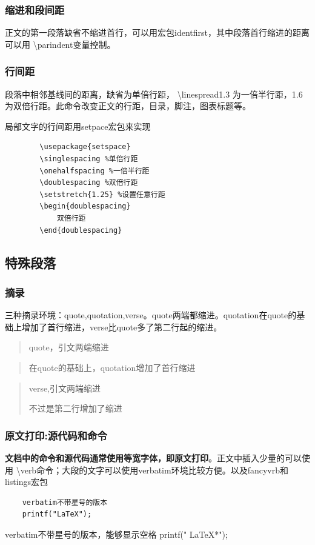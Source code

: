\documentclass[16pt]{article}
\begin{document}
\subsubsection{缩进和段间距}
正文的第一段落缺省不缩进首行，可以用宏包identfirst，其中段落首行缩进的距离可以用 \textbackslash parindent变量控制。

\subsubsection{行间距}
段落中相邻基线间的距离，缺省为单倍行距， \textbackslash linespread{1.3} 为一倍半行距，{1.6}为双倍行距。此命令改变正文的行距，目录，脚注，图表标题等。\par
局部文字的行间距用setpace宏包来实现
\begin{lstlisting}
        \usepackage{setspace}
        \singlespacing %单倍行距
        \onehalfspacing %一倍半行距
        \doublespacing %双倍行距
        \setstretch{1.25} %设置任意行距
        \begin{doublespacing}
            双倍行距
        \end{doublespacing}
    \end{lstlisting}


\subsection{特殊段落}

\subsubsection{摘录}
三种摘录环境：quote,quotation,verse。quote两端都缩进。quotation在quote的基础上增加了首行缩进，verse比quote多了第二行起的缩进。
\begin{quote}
    quote，引文两端缩进
\end{quote}
\begin{quotation}
    在quote的基础上，quotation增加了首行缩进
\end{quotation}
\begin{verse}
    verse,引文两端缩进 \par
    不过是第二行增加了缩进
\end{verse}

\subsubsection{原文打印:源代码和命令}
\textbf{文档中的命令和源代码通常使用等宽字体，即原文打印}。正文中插入少量的可以使用 \textbackslash verb命令；大段的文字可以使用verbatim环境比较方便。以及fancyvrb和listings宏包
\begin{verbatim}
    verbatim不带星号的版本
    printf("LaTeX");
\end{verbatim}
\begin{verbatim*}
    verbatim不带星号的版本，能够显示空格
    printf(" LaTeX*");
\end{verbatim*}
\end{document}

